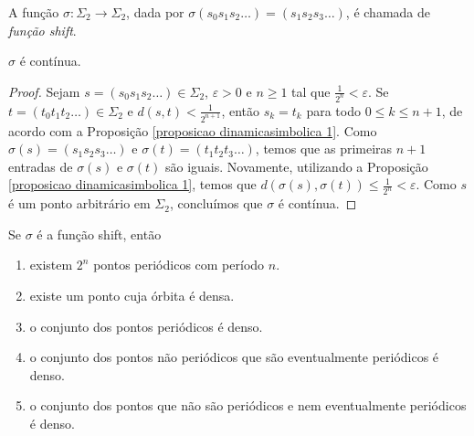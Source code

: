 \begin{definition}
A função $\sigma: \Sigma_2 \to \Sigma_2$, dada por $\sigma(s_0s_1s_2\dots) = (s_1s_2s_3\dots)$, é chamada de \textit{função shift}.
\end{definition}

\begin{proposition}
$\sigma$ é contínua.
\end{proposition}

\begin{proof}
Sejam $s = (s_0s_1s_2\dots) \in \Sigma_2$, $\varepsilon > 0$ e $n \geq 1$ tal que $\frac{1}{2^n} < \varepsilon$. Se $t = (t_0t_1t_2\dots) \in \Sigma_ 2$ e $d(s, t) < \frac{1}{2^{n+1}}$, então $s_k = t_k$ para todo $0 \leq k \leq n+1$, de acordo com a Proposição  \ref{proposicao dinamicasimbolica 1}. Como $\sigma(s) = (s_1s_2s_3\dots)$ e $\sigma(t) = (t_1t_2t_3\dots)$, temos que as primeiras $n+1$ entradas de $\sigma(s)$ e $\sigma(t)$ são iguais. Novamente, utilizando a Proposição \ref{proposicao dinamicasimbolica 1}, temos que $d(\sigma(s), \sigma(t)) \leq \frac{1}{2^n} < \varepsilon$. Como $s$ é um ponto arbitrário em $\Sigma_2$, concluímos que $\sigma$ é contínua.
\end{proof}

\begin{proposition}
Se $\sigma$ é a função shift, então
\begin{enumerate}
\item existem $2^n$ pontos periódicos com período $n$.
\item existe um ponto cuja órbita é densa.
\item o conjunto dos pontos periódicos é denso.
\item o conjunto dos pontos não periódicos que são eventualmente periódicos é denso.
\item o conjunto dos pontos que não são periódicos e nem eventualmente periódicos é denso.
\end{enumerate}
\end{proposition}

